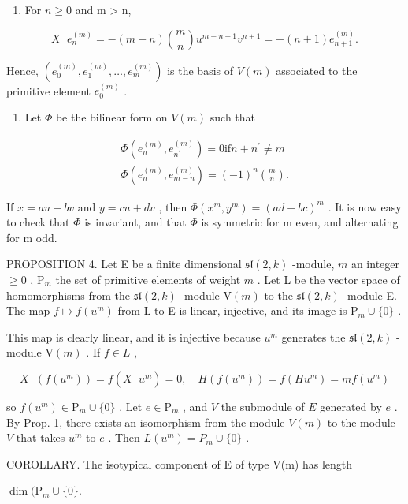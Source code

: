 \begin{enumerate}
\def\labelenumi{\arabic{enumi})}
\setcounter{enumi}{1}
\tightlist
\item
  For \(n \geq 0\) and m \textgreater{} n,
\end{enumerate}

\[
X _ {-} e _ {n} ^ {(m)} = - (m - n) \binom{m}{n} u ^ {m - n - 1} v ^ {n + 1} = - (n + 1) e _ {n + 1} ^ {(m)}.
\]

Hence, \((e_0^{(m)}, e_1^{(m)}, \ldots, e_m^{(m)})\) is the basis of \(V(m)\) associated to the primitive element \(e_0^{(m)}\) .

\begin{enumerate}
\def\labelenumi{\arabic{enumi})}
\setcounter{enumi}{2}
\tightlist
\item
  Let \(\Phi\) be the bilinear form on \(V(m)\) such that
\end{enumerate}

\[
\begin{array}{c} \varPhi (e _ {n} ^ {(m)}, e _ {n ^ {\prime}} ^ {(m)}) = 0 \text {if} n + n ^ {\prime} \neq m \\ \varPhi (e _ {n} ^ {(m)}, e _ {m - n} ^ {(m)}) = (- 1) ^ {n} \binom {m} {n}. \end{array}
\]

If \(x = au + bv\) and \(y = cu + dv\) , then \(\Phi(x^{m}, y^{m}) = (ad - bc)^{m}\) . It is now easy to check that \(\Phi\) is invariant, and that \(\Phi\) is symmetric for m even, and alternating for m odd.

PROPOSITION 4. Let E be a finite dimensional \(\mathfrak{sl}(2,k)\) -module, \(m\) an integer \(\geq 0\) , \(\mathrm{P}_m\) the set of primitive elements of weight \(m\) . Let L be the vector space of homomorphisms from the \(\mathfrak{sl}(2,k)\) -module \(\mathrm{V}(m)\) to the \(\mathfrak{sl}(2,k)\) -module E. The map \(f \mapsto f(u^m)\) from L to E is linear, injective, and its image is \(\mathrm{P}_m \cup \{0\}\) .

This map is clearly linear, and it is injective because \(u^{m}\) generates the \(\mathfrak{sl}(2,k)\) -module \(\mathrm{V}(m)\) . If \(f \in L\) ,

\[
X _ {+} (f (u ^ {m})) = f (X _ {+} u ^ {m}) = 0, \quad H (f (u ^ {m})) = f (H u ^ {m}) = m f (u ^ {m})
\]

so \(f(u^{m}) \in \mathrm{P}_{m} \cup \{0\}\) . Let \(e \in \mathrm{P}_{m}\) , and \(V\) the submodule of \(E\) generated by \(e\) . By Prop. 1, there exists an isomorphism from the module \(V(m)\) to the module \(V\) that takes \(u^{m}\) to \(e\) . Then \(L(u^{m}) = P_{m} \cup \{0\}\) .

COROLLARY. The isotypical component of E of type V(m) has length

\(\dim (\mathrm{P}_m\cup \{0\} .\)

